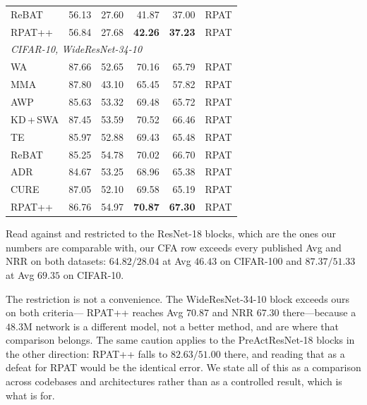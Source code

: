 \begin{table}[!htbp]
\begin{tabular}{lrrrrl}
    ReBAT \citep{rebat}       & 56.13 & 27.60 & 41.87 & 37.00 & RPAT \\
    RPAT++ \citep{rpat}       & 56.84 & 27.68 & \textbf{42.26} & \textbf{37.23} & RPAT \\
    \midrule
    \multicolumn{6}{l}{\emph{CIFAR-10, WideResNet-34-10}} \\
    WA \citep{swa}            & 87.66 & 52.65 & 70.16 & 65.79 & RPAT \\
    MMA \citep{mma}           & 87.80 & 43.10 & 65.45 & 57.82 & RPAT \\
    AWP \citep{2020_awp}      & 85.63 & 53.32 & 69.48 & 65.72 & RPAT \\
    KD\,+\,SWA \citep{kdswa}   & 87.45 & 53.59 & 70.52 & 66.46 & RPAT \\
    TE \citep{te}             & 85.97 & 52.88 & 69.43 & 65.48 & RPAT \\
    ReBAT \citep{rebat}       & 85.25 & 54.78 & 70.02 & 66.70 & RPAT \\
    ADR \citep{adr}           & 84.67 & 53.25 & 68.96 & 65.38 & RPAT \\
    CURE \citep{cure}         & 87.05 & 52.10 & 69.58 & 65.19 & RPAT \\
    RPAT++ \citep{rpat}       & 86.76 & 54.97 & \textbf{70.87} & \textbf{67.30} & RPAT \\
    \bottomrule
  \end{tabular}
\end{table}

Read against  and restricted to the ResNet-18 blocks, which are the ones our numbers
are comparable with, our CFA row exceeds every published Avg and NRR on both datasets: $64.82/28.04$
at Avg $46.43$ on CIFAR-100 and $87.37/51.33$ at Avg $69.35$ on CIFAR-10.

The restriction is not a convenience. The WideResNet-34-10 block exceeds ours on both criteria---
RPAT++ reaches Avg $70.87$ and NRR $67.30$ there---because a $48.3$M network is a different model, not
a better method, and  are where that comparison belongs. The same caution applies to the
PreActResNet-18 blocks in the other direction: RPAT++ falls to $82.63/51.00$ there, and reading that
as a defeat for RPAT would be the identical error. We state all of this as a comparison across
codebases and architectures rather than as a controlled result, which is what  is for.

